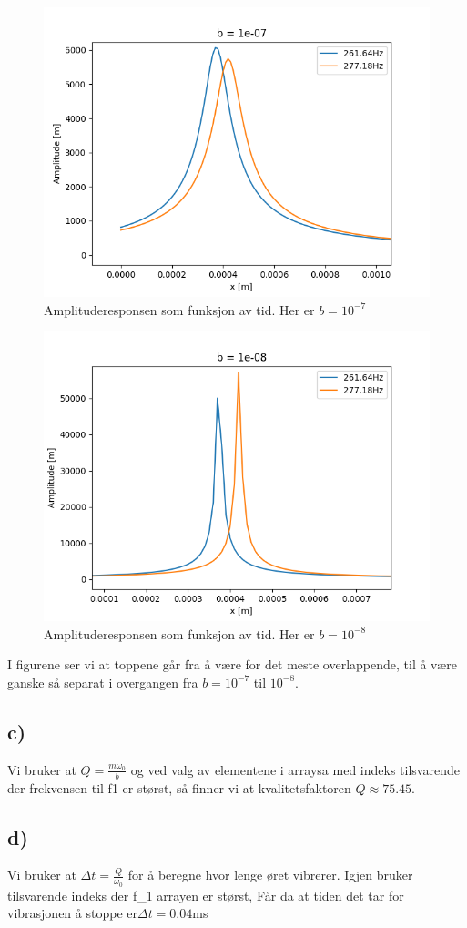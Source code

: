 \documentclass{article}
\newcommand{\subopg}[1]{\subsection*{#1)}}
\begin{document}
\begin{figure}[h!]
    \includegraphics[scale=.5]{b_2_fig_1.png}
    \caption{Amplituderesponsen som funksjon av tid. Her er $b = 10^{-7}$}
\end{figure} 
\begin{figure}[h!]
    \includegraphics[scale=.5]{b_2_fig_2.png}
    \caption{Amplituderesponsen som funksjon av tid. Her er $b=10^{-8}$}
\end{figure}
I figurene ser vi at toppene går fra å være for det meste overlappende, til å være ganske så separat i overgangen fra $b=10^{-7}$ til $10^{-8}$.
\subopg{c}
Vi bruker at $Q=\frac{m\omega_0}{b}$ og ved valg av elementene i arraysa med indeks tilsvarende der frekvensen til f1 er størst, så finner vi at kvalitetsfaktoren $Q\approx 75.45$.
\subopg{d}
Vi bruker at $\Delta t = \frac{Q}{\omega_0}$ for å beregne hvor lenge øret vibrerer. Igjen bruker tilsvarende indeks der f_1 arrayen er størst, Får da at tiden det tar for vibrasjonen å stoppe er$\Delta t = 0.04$ms
\end{document}
